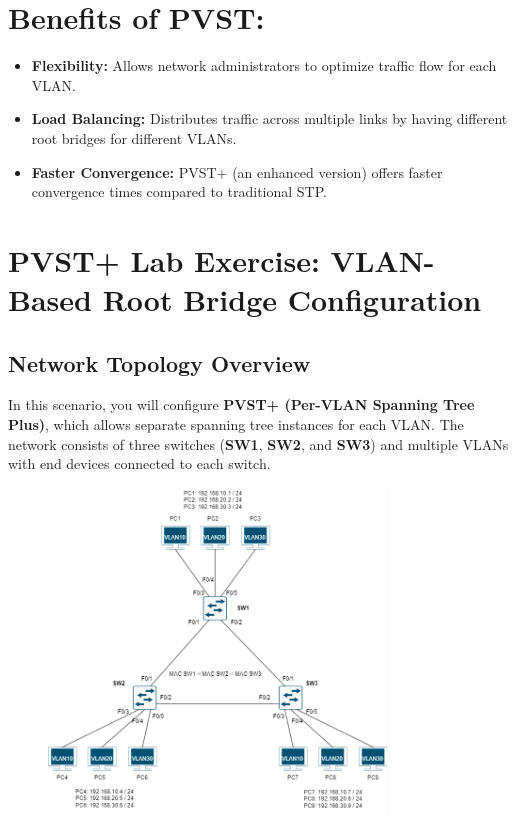\documentclass[a4paper]{book}
\begin{document}
\section*{Benefits of PVST:}
\begin{itemize}
	\item \textbf{Flexibility:} Allows network administrators to optimize traffic flow for each VLAN.
	\item \textbf{Load Balancing:} Distributes traffic across multiple links by having different root bridges for different VLANs.
	\item \textbf{Faster Convergence:} PVST+ (an enhanced version) offers faster convergence times compared to traditional STP.

\end{itemize}

\newpage

\section*{PVST+ Lab Exercise: VLAN-Based Root Bridge Configuration}

\subsection*{Network Topology Overview}
In this scenario, you will configure \textbf{PVST+ (Per-VLAN Spanning Tree Plus)}, which allows separate spanning tree instances for each VLAN. The network consists of three switches (\textbf{SW1}, \textbf{SW2}, and \textbf{SW3}) and multiple VLANs with end devices connected to each switch.


\begin{figure}[h]
	\centering
	\includegraphics[width=0.8\textwidth]{img/pvst01.png}
	\caption{\textit{}}
\end{figure}
\end{document}
